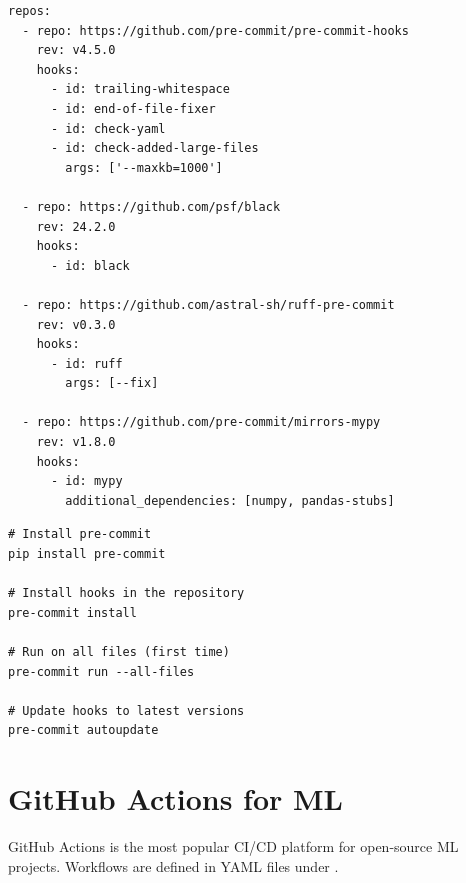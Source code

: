\begin{codeblock}[title=\textbf{.pre-commit-config.yaml}]
\begin{verbatim}
repos:
  - repo: https://github.com/pre-commit/pre-commit-hooks
    rev: v4.5.0
    hooks:
      - id: trailing-whitespace
      - id: end-of-file-fixer
      - id: check-yaml
      - id: check-added-large-files
        args: ['--maxkb=1000']

  - repo: https://github.com/psf/black
    rev: 24.2.0
    hooks:
      - id: black

  - repo: https://github.com/astral-sh/ruff-pre-commit
    rev: v0.3.0
    hooks:
      - id: ruff
        args: [--fix]

  - repo: https://github.com/pre-commit/mirrors-mypy
    rev: v1.8.0
    hooks:
      - id: mypy
        additional_dependencies: [numpy, pandas-stubs]
\end{verbatim}
\end{codeblock}

\begin{codeblock}[title=\textbf{Setting up pre-commit}]
\begin{verbatim}
# Install pre-commit
pip install pre-commit

# Install hooks in the repository
pre-commit install

# Run on all files (first time)
pre-commit run --all-files

# Update hooks to latest versions
pre-commit autoupdate
\end{verbatim}
\end{codeblock}

\section{GitHub Actions for ML}
\label{sec:github-actions}

GitHub Actions is the most popular CI/CD platform for open-source ML
projects. Workflows are defined in YAML files under
.

